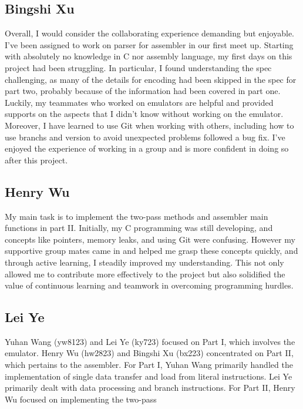 \documentclass[11pt]{article}
\begin{document}
\subsection{Bingshi Xu}
Overall, I would consider the collaborating experience demanding but enjoyable. I've been assigned to work on parser for assembler in our first meet up.
Starting with absolutely no knowledge in C nor assembly language, my first days on this project had been struggling. 
In particular, I found understanding the spec challenging, as many of the details for encoding had been skipped in the spec for part two, probably because of 
the information had been covered in part one. 
Luckily, my teammates who worked on emulators are helpful and provided supports on the aspects that I didn't know without working on the emulator.
Moreover, I have learned to use Git when working with others, including how to use branchs and version to avoid unexpected problems followed a bug fix.
I've enjoyed the experience of working in a group and is more confident in doing so after this project.  

\subsection{Henry Wu}

My main task is to implement the two-pass methods and assembler main functions in part II. 
Initially, my C programming was still developing, and concepts like pointers, memory leaks, 
and using Git were confusing. However my supportive group mates came in and helped me grasp 
these concepts quickly, and through active learning, I steadily improved my understanding. 
This not only allowed me to contribute more effectively to the project but also 
solidified the value of continuous learning and teamwork in overcoming programming hurdles.

\subsection{Lei Ye}

Yuhan Wang (yw8123) and Lei Ye (ky723) focused on Part I, which involves the emulator. Henry Wu (hw2823) and Bingshi Xu (bx223) concentrated on Part II, which pertains to the assembler.
For Part I, Yuhan Wang primarily handled the implementation of single data transfer and load from literal instructions. Lei Ye primarily dealt with data processing and branch instructions.
For Part II, Henry Wu focused on implementing the two-pass 
\end{document}
